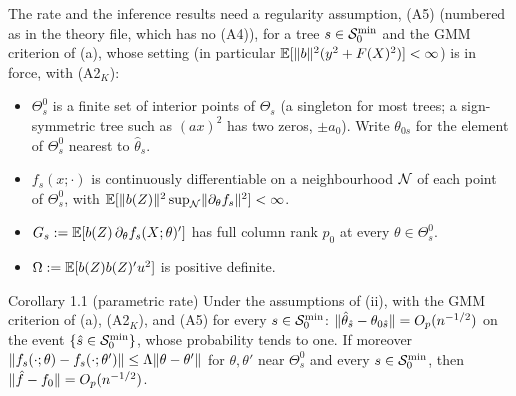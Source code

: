 The rate and the inference results need a regularity assumption, (A5) (numbered as in the theory file, which has no (A4)), for a tree $s \in \mathcal{S}_0^{\min}$ and the GMM criterion of (a), whose setting (in particular $\mathbb{E}[\lVert b\rVert^2(y^2 + F(X)^2)] < \infty$) is in force, with (A2$_K$):
\begin{itemize}
\item[(a)] $\Theta_s^0$ is a finite set of interior points of $\Theta_s$ (a singleton for most trees; a sign-symmetric tree such as $(ax)^2$ has two zeros, $\pm a_0$). Write $\theta_{0s}$ for the element of $\Theta_s^0$ nearest to $\hat\theta_s$.
\item[(b)] $f_s(x;\cdot)$ is continuously differentiable on a neighbourhood $\mathcal{N}$ of each point of $\Theta_s^0$, with $\mathbb{E}[\lVert b(Z)\rVert^2\sup_{\mathcal{N}}\lVert \partial_\theta f_s\rVert^2] < \infty$.
\item[(c)] $G_s := \mathbb{E}[b(Z)\,\partial_\theta f_s(X;\theta)']$ has full column rank $p_0$ at every $\theta \in \Theta_s^0$.
\item[(d)] $\Omega := \mathbb{E}[b(Z)b(Z)'u^2]$ is positive definite.
\end{itemize}

\begin{result}[Corollary1.1]{Corollary 1.1 (parametric rate)}
Under the assumptions of (ii), with the GMM criterion of (a), (A2$_K$), and (A5) for every $s \in \mathcal{S}_0^{\min}$: $\lVert \hat\theta_{\hat s} - \theta_{0\hat s}\rVert = O_p(n^{-1/2})$ on the event $\{\hat s \in \mathcal{S}_0^{\min}\}$, whose probability tends to one. If moreover $\lVert f_s(\cdot;\theta) - f_s(\cdot;\theta')\rVert \le \Lambda\lVert \theta - \theta'\rVert$ for $\theta, \theta'$ near $\Theta_s^0$ and every $s \in \mathcal{S}_0^{\min}$, then $\lVert \hat f - f_0\rVert = O_p(n^{-1/2})$.
\end{result}

